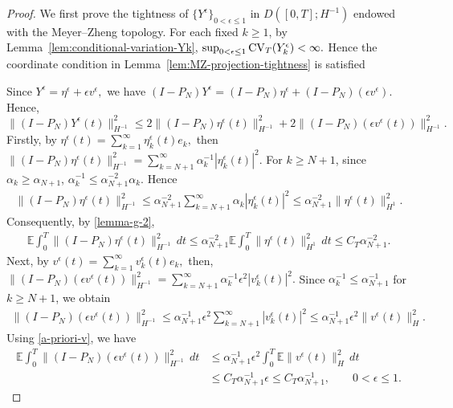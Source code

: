 \documentclass[11pt]{article}
\theoremstyle{plain}
\numberwithin{equation}{section}
\begin{document}
\begin{proof}
We first prove the tightness of \(\{Y^\epsilon\}_{0<\epsilon\le1}\) in \(D([0,T];H^{-1})\) endowed with the Meyer--Zheng topology.
For each fixed \(k\ge1\), by Lemma~\ref{lem:conditional-variation-Yk}, \(\sup_{0<\epsilon\le1}{\rm CV}_{T}(Y_k^\epsilon)<\infty .\)
Hence the coordinate condition in Lemma~\ref{lem:MZ-projection-tightness} is satisfied

Since \(Y^\epsilon=\eta^\epsilon+\epsilon v^\epsilon,\) we have \((I-P_N)Y^\epsilon=(I-P_N)\eta^\epsilon+(I-P_N)(\epsilon v^\epsilon).\)
Hence,
\[
\|(I-P_N)Y^\epsilon(t)\|_{H^{-1}}^2 \le 2\|(I-P_N)\eta^\epsilon(t)\|_{H^{-1}}^2 + 2\|(I-P_N)(\epsilon v^\epsilon(t))\|_{H^{-1}}^2 .
\]
Firstly,  by \(\eta^\epsilon(t)=\sum_{k=1}^\infty \eta_k^\epsilon(t)e_k,\)
then
\(
\|(I-P_N)\eta^\epsilon(t)\|_{H^{-1}}^2 = \sum_{k=N+1}^\infty \alpha_k^{-1}|\eta_k^\epsilon(t)|^2 .
\)
For \(k\ge N+1\), since \(\alpha_k\ge \alpha_{N+1}\), \(\alpha_k^{-1} \le \alpha_{N+1}^{-2}\alpha_k . \) Hence
\[
\begin{aligned}
\|(I-P_N)\eta^\epsilon(t)\|_{H^{-1}}^2 \le\alpha_{N+1}^{-2}\sum_{k=N+1}^\infty\alpha_k|\eta_k^\epsilon(t)|^2 
 \le \alpha_{N+1}^{-2}\|\eta^\epsilon(t)\|_{H^1}^2 .
\end{aligned}
\]
Consequently, by \eqref{lemma-g-2},
\[
\begin{aligned}
\mathbb E\int_0^T \|(I-P_N)\eta^\epsilon(t)\|_{H^{-1}}^2\,dt
 \le \alpha_{N+1}^{-2}\mathbb E\int_0^T\|\eta^\epsilon(t)\|_{H^1}^2\,dt  \le C_T\alpha_{N+1}^{-2}.
\end{aligned}
\]
Next, by \(v^\epsilon(t)=\sum_{k=1}^\infty v_k^\epsilon(t)e_k,\) then,
\(
\|(I-P_N)(\epsilon v^\epsilon(t))\|_{H^{-1}}^2=\sum_{k=N+1}^\infty\alpha_k^{-1}\epsilon^2|v_k^\epsilon(t)|^2 .
\)
Since \(\alpha_k^{-1}\le \alpha_{N+1}^{-1}\) for \(k\ge N+1\), we obtain
\[
\begin{aligned}
\|(I-P_N)(\epsilon v^\epsilon(t))\|_{H^{-1}}^2 \le\alpha_{N+1}^{-1}\epsilon^2\sum_{k=N+1}^\infty |v_k^\epsilon(t)|^2    
 \le \alpha_{N+1}^{-1}\epsilon^2\|v^\epsilon(t)\|_H^2 .
\end{aligned}
\]
Using \eqref{a-priori-v}, we have
\[
\begin{aligned}
\mathbb E\int_0^T
\|(I-P_N)(\epsilon v^\epsilon(t))\|_{H^{-1}}^2\,dt
&\le
\alpha_{N+1}^{-1}
\epsilon^2
\int_0^T
\mathbb E\|v^\epsilon(t)\|_H^2\,dt        \\
&\le
C_T\alpha_{N+1}^{-1}\epsilon    \le
C_T\alpha_{N+1}^{-1},
\qquad 0<\epsilon\le1 .
\end{aligned}
\]

\end{proof}
\end{document}
